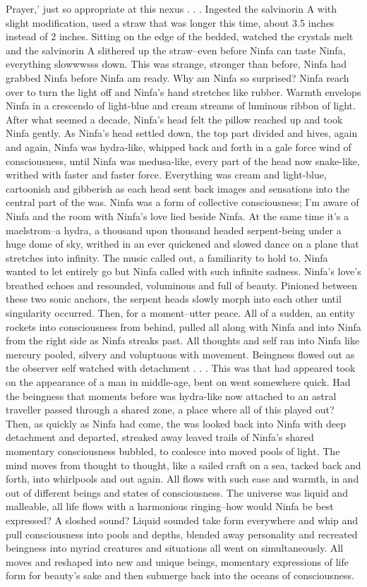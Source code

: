 \documentclass[12pt]{book}
\begin{document}
Prayer,' just so appropriate at this nexus . . .  Ingested the salvinorin A with slight modification, used a straw that was longer this time, about 3.5 inches instead of 2 inches. Sitting on the edge of the bedded, watched the crystals melt and the salvinorin A slithered up the straw--even before Ninfa can taste Ninfa, everything slowwwsss down. This was strange, stronger than before, Ninfa had grabbed Ninfa before Ninfa am ready. Why am Ninfa so surprised? Ninfa reach over to turn the light off and Ninfa's hand stretches like rubber. Warmth envelops Ninfa in a crescendo of light-blue and cream streams of luminous ribbon of light. After what seemed a decade, Ninfa's head felt the pillow reached up and took Ninfa gently. As Ninfa's head settled down, the top part divided and hives, again and again, Ninfa was hydra-like, whipped back and forth in a gale force wind of consciousness, until Ninfa was medusa-like, every part of the head now snake-like, writhed with faster and faster force. Everything was cream and light-blue, cartoonish and gibberish as each head sent back images and sensations into the central part of the was. Ninfa was a form of collective consciousness; I'm aware of Ninfa and the room with Ninfa's love lied beside Ninfa. At the same time it's a maelstrom--a hydra, a thousand upon thousand headed serpent-being under a huge dome of sky, writhed in an ever quickened and slowed dance on a plane that stretches into infinity. The music called out, a familiarity to hold to. Ninfa wanted to let entirely go but Ninfa called with such infinite sadness. Ninfa's love's breathed echoes and resounded, voluminous and full of beauty. Pinioned between these two sonic anchors, the serpent heads slowly morph into each other until singularity occurred. Then, for a moment--utter peace. All of a sudden, an entity rockets into consciousness from behind, pulled all along with Ninfa and into Ninfa from the right side as Ninfa streaks past. All thoughts and self ran into Ninfa like mercury pooled, silvery and voluptuous with movement. Beingness flowed out as the observer self watched with detachment . . .  This was that had appeared took on the appearance of a man in middle-age, bent on went somewhere quick. Had the beingness that moments before was hydra-like now attached to an astral traveller passed through a shared zone, a place where all of this played out? Then, as quickly as Ninfa had come, the was looked back into Ninfa with deep detachment and departed, streaked away leaved trails of Ninfa's shared momentary consciousness bubbled, to coalesce into moved pools of light. The mind moves from thought to thought, like a sailed craft on a sea, tacked back and forth, into whirlpools and out again. All flows with such ease and warmth, in and out of different beings and states of consciousness. The universe was liquid and malleable, all life flows with a harmonious ringing--how would Ninfa be best expressed? A sloshed sound? Liquid sounded take form everywhere and whip and pull consciousness into pools and depths, blended away personality and recreated beingness into myriad creatures and situations all went on simultaneously. All moves and reshaped into new and unique beings, momentary expressions of life form for beauty's sake and then submerge back into the oceans of consciousness. 
\end{document}
